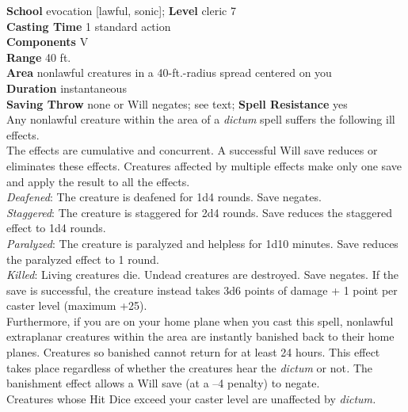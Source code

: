 \textbf{School} evocation [lawful, sonic]; \textbf{Level} cleric 7\\
\textbf{Casting Time} 1 standard action\\
\textbf{Components} V\\
\textbf{Range} 40 ft.\\
\textbf{Area} nonlawful creatures in a 40-ft.-radius spread centered on you\\
\textbf{Duration} instantaneous\\
\textbf{Saving Throw} none or Will negates; see text; \textbf{Spell Resistance} yes\\
Any nonlawful creature within the area of a \textit{dictum }spell suffers the following ill effects.\\
The effects are cumulative and concurrent. A successful Will save reduces or eliminates these effects. Creatures affected by multiple effects make only one save and apply the result to all the effects.\\
\textit{Deafened}: The creature is deafened for 1d4 rounds. Save negates.\\
\textit{Staggered}: The creature is staggered for 2d4 rounds. Save reduces the staggered effect to 1d4 rounds.\\
\textit{Paralyzed}: The creature is paralyzed and helpless for 1d10 minutes. Save reduces the paralyzed effect to 1 round.\\
\textit{Killed}: Living creatures die. Undead creatures are destroyed. Save negates. If the save is successful, the creature instead takes 3d6 points of damage + 1 point per caster level (maximum +25).\\
Furthermore, if you are on your home plane when you cast this spell, nonlawful extraplanar creatures within the area are instantly banished back to their home planes. Creatures so banished cannot return for at least 24 hours. This effect takes place regardless of whether the creatures hear the \textit{dictum }or not\textit{. }The banishment effect allows a Will save (at a --4 penalty) to negate.\\
Creatures whose Hit Dice exceed your caster level are unaffected by \textit{dictum.}\\
